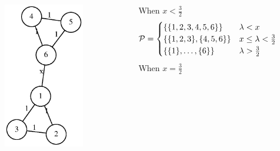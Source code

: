 \documentclass[notheorems]{beamer}
\begin{document}
\begin{frame}
	\begin{columns}
		\column{4.5cm}
	\begin{figure}
		\centering
		\includegraphics[width=0.8\textwidth]{pic/6point.eps}
	\end{figure}	
		\column{6cm}
  	When $ x < \frac{3}{2}$		
	\begin{equation*}
	 \P = 
		\begin{cases}
			\{\{1,2,3,4,5,6\}\} & \lambda < x \\
			\{\{1,2,3\},\{4,5,6\}\} & x \leq \lambda  < \frac{3}{2} \\
			\{\{1\},\dots,\{6\}\} &  \lambda > \frac{3}{2}
		\end{cases}
	\end{equation*}
    When	$ x = \frac{3}{2}$		
	\begin{equation*}

\end{equation*}
\end{columns}
\end{frame}
\end{document}
